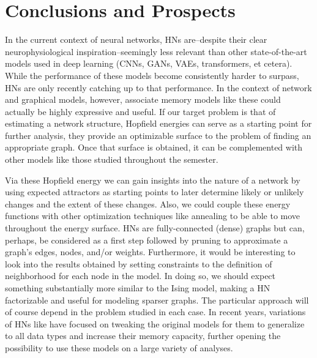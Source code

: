 \documentclass[11pt]{article}
\begin{document}

	\section{Conclusions and Prospects}
	In the current context of neural networks, HNs are–despite their clear neurophysiological inspiration–seemingly less relevant than other state-of-the-art models used in deep learning (CNNs, GANs, VAEs, transformers, et cetera). 
	While the performance of these models become consistently harder to surpass, HNs are only recently catching up to that performance.
	In the context of network and graphical models, however, associate memory models like these could actually be highly expressive and useful.
	If our target problem is that of estimating a network structure, Hopfield energies can serve as a starting point for further analysis, they provide an optimizable surface to the problem of finding an appropriate graph.
	Once that surface is obtained, it can be complemented with other models like those studied throughout the semester.

	Via these Hopfield energy we can gain insights into the nature of a network by using expected attractors as starting points to later determine likely or unlikely changes and the extent of these changes.
	Also, we could couple these energy functions with other optimization techniques like annealing to be able to move throughout the energy surface.
	HNs are fully-connected (dense) graphs but can, perhaps, be considered as a first step followed by pruning to approximate a graph's edges, nodes, and/or weights. 
	Furthermore, it would be interesting to look into the results obtained by setting constraints to the definition of neighborhood for each node in the model.
	In doing so, we should expect something substantially more similar to the Ising model, making a HN factorizable and useful for modeling sparser graphs. 
	The particular approach will of course depend in the problem studied in each case. In recent years, variations of HNs like \cite{krotov2016dense} have focused on tweaking the original models for them to generalize to all data types and increase their memory capacity, further opening the possibility to use these models on a large variety of analyses.
	 
	\pagebreak
	\printbibliography[title={References}]
	
\end{document}
